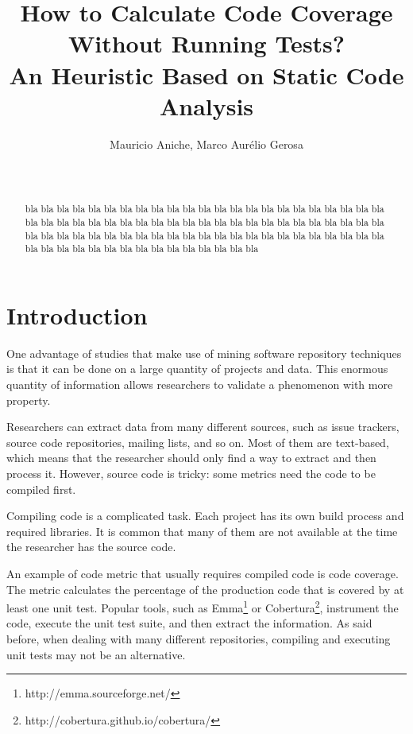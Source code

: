 \documentclass{sig-alternate}
\begin{document}

\title{How to Calculate Code Coverage Without Running Tests?\\
An Heuristic Based on Static Code Analysis}


\author{
\alignauthor
Mauricio Aniche, Marco Aurélio Gerosa\\
\\
\\
}

\maketitle
\begin{abstract}

bla bla bla bla bla bla bla bla bla bla bla bla bla bla bla bla bla bla bla bla bla bla bla bla
bla bla bla bla bla bla bla bla bla bla bla bla
bla bla bla bla bla bla bla bla bla bla bla bla
bla bla bla bla bla bla bla bla bla bla bla bla
bla bla bla bla bla bla bla bla bla bla bla bla
bla bla bla bla bla bla bla bla bla bla bla bla


\end{abstract}

\section{Introduction}

One advantage of studies that make use of mining software repository techniques
is that it can be done on a large quantity of projects and data. This enormous 
quantity of information allows researchers to validate a phenomenon with more
property.

Researchers can extract data from many different sources, such as issue trackers,
source code repositories, mailing lists, and so on. Most of them are text-based, which
means that the researcher should only find a way to extract and then process it. 
However, source code is tricky: some metrics need the code to be compiled first.

Compiling code is a complicated task. Each project has its own build process and
required libraries. It is common that many of them are not available at the time the
researcher has the source code.

An example of code metric that usually requires compiled code is code coverage. 
The metric calculates the percentage of the production code that is covered by at least
one unit test. Popular tools, such as Emma\footnote{http://emma.sourceforge.net/} or
Cobertura\footnote{http://cobertura.github.io/cobertura/}, instrument the code, execute
the unit test suite, and then extract the information. As said before, when dealing
with many different repositories, compiling and executing unit tests may not be
an alternative.
\end{document}
